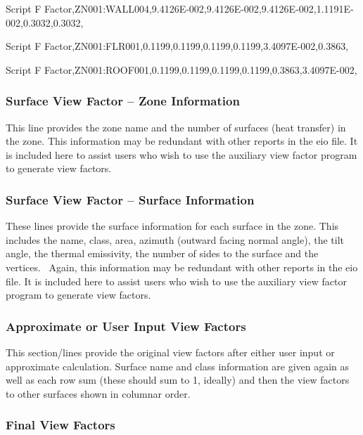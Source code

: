 Script F Factor,ZN001:WALL004,9.4126E-002,9.4126E-002,9.4126E-002,1.1191E-002,0.3032,0.3032,

Script F Factor,ZN001:FLR001,0.1199,0.1199,0.1199,0.1199,3.4097E-002,0.3863,

Script F Factor,ZN001:ROOF001,0.1199,0.1199,0.1199,0.1199,0.3863,3.4097E-002,

\subsubsection{Surface View Factor -- Zone Information}\label{surface-view-factor-zone-information}

This line provides the zone name and the number of surfaces (heat transfer) in the zone. This information may be redundant with other reports in the eio file. It is included here to assist users who wish to use the auxiliary view factor program to generate view factors.

\subsubsection{Surface View Factor -- Surface Information}\label{surface-view-factor-surface-information}

These lines provide the surface information for each surface in the zone. This includes the name, class, area, azimuth (outward facing normal angle), the tilt angle, the thermal emissivity, the number of sides to the surface and the vertices.~ Again, this information may be redundant with other reports in the eio file. It is included here to assist users who wish to use the auxiliary view factor program to generate view factors.

\subsubsection{Approximate or User Input View Factors}\label{approximate-or-user-input-view-factors}

This section/lines provide the original view factors after either user input or approximate calculation. Surface name and class information are given again as well as each row sum (these should sum to 1, ideally) and then the view factors to other surfaces shown in columnar order.

\subsubsection{Final View Factors}\label{final-view-factors}


